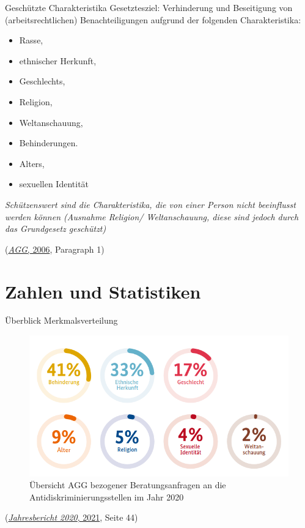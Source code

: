 \documentclass[
  10pt,
  ignorenonframetext,
]{beamer}
\providecommand{\tightlist}{%
  \setlength{\itemsep}{0pt}\setlength{\parskip}{0pt}}
\begin{document}
\begin{frame}{Geschützte Charakteristika}
\protect\hypertarget{geschuxfctzte-charakteristika}{}
Gesetztesziel: Verhinderung und Beseitigung von (arbeitsrechtlichen)
Benachteiligungen aufgrund der folgenden Charakteristika:

\begin{itemize}
\tightlist
\item
  Rasse,
\item
  ethnischer Herkunft,
\item
  Geschlechts,
\item
  Religion,
\item
  Weltanschauung,
\item
  Behinderungen.
\item
  Alters,
\item
  sexuellen Identität
\end{itemize}

\emph{Schützenswert sind die Charakteristika, die von einer Person nicht
beeinflusst werden können (Ausnahme Religion/ Weltanschauung, diese sind
jedoch durch das Grundgesetz geschützt)}

(\protect\hyperlink{ref-agg}{\emph{AGG}, 2006}, Paragraph 1)
\end{frame}

\hypertarget{zahlen-und-statistiken}{%
\section{Zahlen und Statistiken}\label{zahlen-und-statistiken}}

\begin{frame}{Überblick Merkmalsverteilung}
\protect\hypertarget{uxfcberblick-merkmalsverteilung}{}
\begin{figure}
\centering
\includegraphics[width=\textwidth,height=0.4\textheight]{plots/verteilung_merkmale_s44.png}
\caption{Übersicht AGG bezogener Beratungsanfragen an die
Antidiskriminierungsstellen im Jahr 2020}
\end{figure}

(\protect\hyperlink{ref-jb2020}{\emph{Jahresbericht 2020}, 2021}, Seite
44)
\end{frame}
\end{document}
